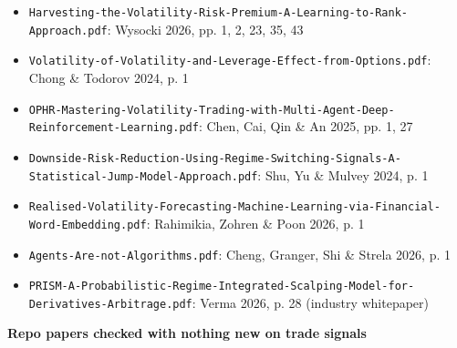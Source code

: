 \documentclass{article}
\begin{document}
\begin{itemize}

\item \texttt{Harvesting-\allowbreak{}the-\allowbreak{}Volatility-\allowbreak{}Risk-\allowbreak{}Premium-\allowbreak{}A-\allowbreak{}Learning-\allowbreak{}to-\allowbreak{}Rank-\allowbreak{}Approach.\allowbreak{}pdf}: Wysocki 2026, pp. 1, 2, 23, 35, 43

\item \texttt{Volatility-\allowbreak{}of-\allowbreak{}Volatility-\allowbreak{}and-\allowbreak{}Leverage-\allowbreak{}Effect-\allowbreak{}from-\allowbreak{}Options.\allowbreak{}pdf}: Chong \& Todorov 2024, p. 1

\item \texttt{OPHR-\allowbreak{}Mastering-\allowbreak{}Volatility-\allowbreak{}Trading-\allowbreak{}with-\allowbreak{}Multi-\allowbreak{}Agent-\allowbreak{}Deep-\allowbreak{}Reinforcement-\allowbreak{}Learning.\allowbreak{}pdf}: Chen, Cai, Qin \& An 2025, pp. 1, 27

\item \texttt{Downside-\allowbreak{}Risk-\allowbreak{}Reduction-\allowbreak{}Using-\allowbreak{}Regime-\allowbreak{}Switching-\allowbreak{}Signals-\allowbreak{}A-\allowbreak{}Statistical-\allowbreak{}Jump-\allowbreak{}Model-\allowbreak{}Approach.\allowbreak{}pdf}: Shu, Yu \& Mulvey 2024, p. 1

\item \texttt{Realised-\allowbreak{}Volatility-\allowbreak{}Forecasting-\allowbreak{}Machine-\allowbreak{}Learning-\allowbreak{}via-\allowbreak{}Financial-\allowbreak{}Word-\allowbreak{}Embedding.\allowbreak{}pdf}: Rahimikia, Zohren \& Poon 2026, p. 1

\item \texttt{Agents-\allowbreak{}Are-\allowbreak{}not-\allowbreak{}Algorithms.\allowbreak{}pdf}: Cheng, Granger, Shi \& Strela 2026, p. 1

\item \texttt{PRISM-\allowbreak{}A-\allowbreak{}Probabilistic-\allowbreak{}Regime-\allowbreak{}Integrated-\allowbreak{}Scalping-\allowbreak{}Model-\allowbreak{}for-\allowbreak{}Derivatives-\allowbreak{}Arbitrage.\allowbreak{}pdf}: Verma 2026, p. 28 (industry whitepaper)

\end{itemize}

\textbf{Repo papers checked with nothing new on trade signals}
\end{document}
